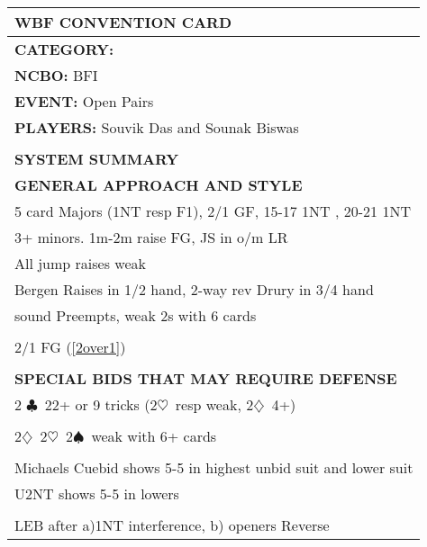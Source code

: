 \documentclass{article}
\newcommand\C{\ensuremath{\clubsuit}}
\newcommand\D{\ensuremath{\diamondsuit}}
\renewcommand\H{\ensuremath{\heartsuit}}
\renewcommand\S{\ensuremath{\spadesuit}}
\begin{document}
\begin{minipage}{5mm}
	\begin{tabular}{| p{5mm} |}
	\end{tabular}
\end{minipage}
\begin{minipage}{90mm}
	\begin{tabular}{| p{88mm} |}
		\hline
		\cellcolor[gray]{0.9} \textbf{WBF CONVENTION CARD} \\ \hline
		\textbf{CATEGORY:} \\
		\textbf{NCBO:} BFI \\
		\textbf{EVENT:} Open Pairs \\
		\textbf{PLAYERS:} Souvik Das and Sounak Biswas \\
		\multirow{2}{*}{} \\
		\\
		\cellcolor[gray]{0.9} \textbf{SYSTEM SUMMARY} \\ \hline
		\textbf{GENERAL APPROACH AND STYLE} \\ \hline
                5 card Majors (1NT resp F1), 2/1 GF, 15-17 1NT , 20-21 1NT
                \\ \hline
                3+ minors. 1m-2m raise FG, JS in o/m LR
                \\ \hline
                All jump raises weak
		\\ \hline
                Bergen Raises in 1/2 hand, 2-way rev Drury in 3/4 hand
		\\ \hline 
                sound Preempts, weak 2s with 6 cards 
		\\ \hline
		\\ \hline
                2/1 FG (\ref{2over1})
		\\ \hline
		\\ \hline
		\textbf{SPECIAL BIDS THAT MAY REQUIRE DEFENSE} \\ \hline
                2 \C\ 22+ or 9 tricks (2\H\ resp weak, 2\D\ 4+)
		\\ \hline
		\\ \hline
                2\D\, 2\H\, 2\S\ weak with 6+ cards
		\\ \hline
		\\ \hline
                Michaels Cuebid shows 5-5 in highest unbid suit and lower suit
		\\ \hline
                U2NT shows 5-5 in lowers
		\\ \hline
		\\ \hline
                LEB after a)1NT interference, b) openers Reverse

\end{tabular}
\end{minipage}
\end{document}
